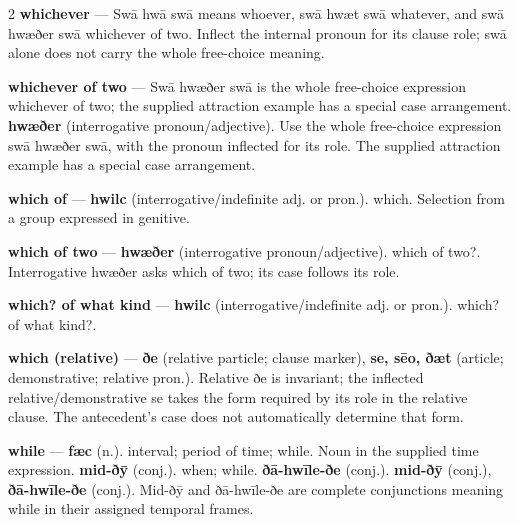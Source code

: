 \begin{multicols}{2}
\textbf{whichever} — Swā hwā swā means whoever, swā hwæt swā whatever, and swā hwæðer swā whichever of two. Inflect the internal pronoun for its clause role; swā alone does not carry the whole free-choice meaning.\par
\textbf{whichever of two} — Swā hwæðer swā is the whole free-choice expression whichever of two; the supplied attraction example has a special case arrangement. \textbf{hwæðer} (interrogative pronoun/adjective). Use the whole free-choice expression swā hwæðer swā, with the pronoun inflected for its role. The supplied attraction example has a special case arrangement.\par
\textbf{which of} — \textbf{hwilc} (interrogative/indefinite adj. or pron.). which. Selection from a group expressed in genitive.\par
\textbf{which of two} — \textbf{hwæðer} (interrogative pronoun/adjective). which of two?. Interrogative hwæðer asks which of two; its case follows its role.\par
\textbf{which? of what kind} — \textbf{hwilc} (interrogative/indefinite adj. or pron.). which? of what kind?.\par
\textbf{which (relative)} — \textbf{ðe} (relative particle; clause marker), \textbf{se, sēo, ðæt} (article; demonstrative; relative pron.). Relative ðe is invariant; the inflected relative/demonstrative se takes the form required by its role in the relative clause. The antecedent’s case does not automatically determine that form.\par
\textbf{while} — \textbf{fæc} (n.). interval; period of time; while. Noun in the supplied time expression. \textbf{mid-ðȳ} (conj.). when; while. \textbf{ðā-hwīle-ðe} (conj.).  \textbf{mid-ðȳ} (conj.), \textbf{ðā-hwīle-ðe} (conj.). Mid-ðȳ and ðā-hwīle-ðe are complete conjunctions meaning while in their assigned temporal frames.\par

\end{multicols}
